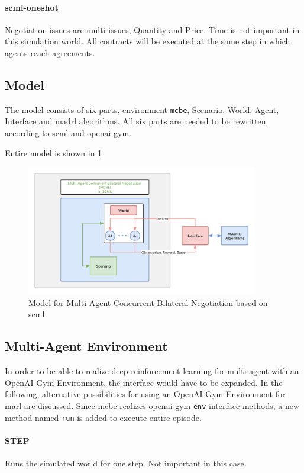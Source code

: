 \paragraph{\gls{scml-oneshot}} Negotiation issues are multi-issues, Quantity and Price. Time is not important in this simulation world. All contracts will be executed at the same step in which agents reach agreements.

\subsection{Model}
The model consists of six parts, environment \texttt{\gls{mcbe}}, Scenario, World, Agent, Interface and \gls{madrl} algorithms.
All six parts are needed to be rewritten according to \gls{scml} and \gls{openai gym}. 

Entire model is shown in \ref{fig:environment-multi-agent}
\begin{figure}[htbp]
\centering
\includegraphics[width=0.9\textwidth]{./images/MCBE.png}
\caption{Model for Multi-Agent Concurrent Bilateral Negotiation based on \gls{scml}}
\label{fig:environment-multi-agent}
\end{figure}

\subsection{Multi-Agent Environment} \label{multi-agent-env}
In order to be able to realize deep reinforcement learning for multi-agent with an OpenAI Gym Environment, the interface would have to be expanded. In the following, alternative possibilities for using an OpenAI Gym Environment for \gls{marl} are discussed. 
Since \gls{mcbe} realizes \gls{openai gym} \texttt{env} interface methods, a new method named \texttt{run} is added to execute entire episode.

\paragraph{STEP} Runs the simulated world for one step. Not important in this case. 
